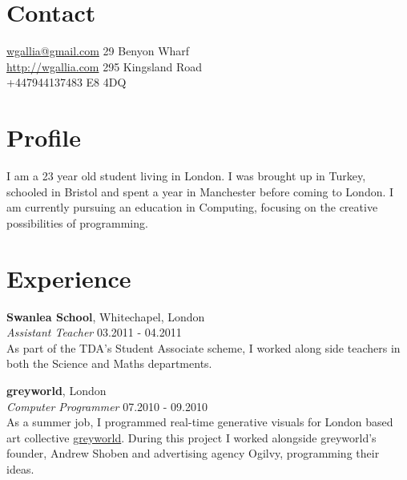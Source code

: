 \documentclass[margin,line,a4paper]{resume}
\begin{document}

\begin{resume}

\section{\mysidestyle Contact}

\hypersetup{urlcolor=Fuchsia}
\href{mailto:wgallia@gmail.com}{wgallia@gmail.com}	\hfill 	29 Benyon Wharf   \\
\hypersetup{urlcolor=RoyalBlue}
\href{http://wgallia.com}{http://wgallia.com}		\hfill  295 Kingsland Road \\
+447944137483										\hfill	E8 4DQ \\

\section{\mysidestyle Profile}

I am a 23 year old student living in London. I was brought up in Turkey, schooled in Bristol and spent a year in Manchester before coming to London. I am currently pursuing an education in Computing, focusing on the creative possibilities of programming.

\section{\mysidestyle Experience}
\textbf{Swanlea School}, Whitechapel, London \vspace{1mm}\\
\textsl{Assistant Teacher} \hfill 03.2011 - 04.2011 \vspace{2mm} \\
As part of the TDA’s Student Associate scheme, I worked along side teachers in both the Science and Maths departments.

\textbf{greyworld}, London  \vspace{1mm}\\
\textsl{Computer Programmer} \hfill 07.2010 - 09.2010 \vspace{2mm} \\
As a summer job, I programmed real-time generative visuals for London based art collective \href{http://greyworld.org}{greyworld}. During this project I worked alongside greyworld's founder, Andrew Shoben and advertising agency Ogilvy, programming their ideas.


\end{resume}
\end{document}
